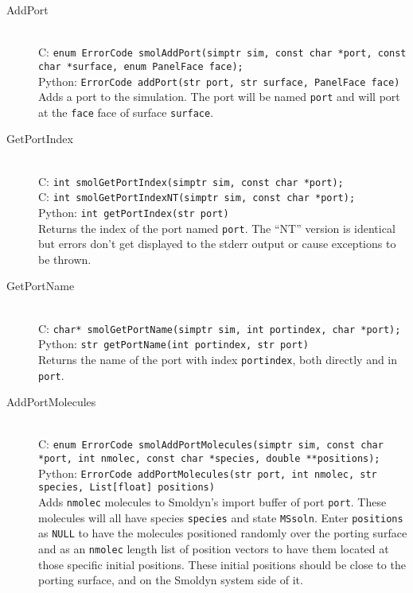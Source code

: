 \documentclass {book}
\begin{document}
\begin{description}

\item[AddPort]
\hfill \\
C: \texttt{enum ErrorCode smolAddPort(simptr sim, const char *port, const char *surface, enum PanelFace face);}\\
Python: \texttt{ErrorCode addPort(str port, str surface, PanelFace face)}\\
Adds a port to the simulation. The port will be named \texttt{port} and will port at the \texttt{face} face of surface \texttt{surface}.

\item[GetPortIndex]
\hfill \\
C: \texttt{int smolGetPortIndex(simptr sim, const char *port);}\\
C: \texttt{int smolGetPortIndexNT(simptr sim, const char *port);}\\
Python: \texttt{int getPortIndex(str port)}\\
Returns the index of the port named \texttt{port}. The ``NT'' version is identical but errors don't get displayed to the stderr output or cause exceptions to be thrown.

\item[GetPortName]
\hfill \\
C: \texttt{char* smolGetPortName(simptr sim, int portindex, char *port);}\\
Python: \texttt{str getPortName(int portindex, str port)}\\
Returns the name of the port with index \texttt{portindex}, both directly and in \texttt{port}.

\item[AddPortMolecules]
\hfill \\
C: \texttt{enum ErrorCode smolAddPortMolecules(simptr sim, const char *port, int nmolec, const char *species, double **positions);}\\
Python: \texttt{ErrorCode addPortMolecules(str port, int nmolec, str species, List[float] positions)}\\
Adds \texttt{nmolec} molecules to Smoldyn's import buffer of port \texttt{port}. These molecules will all have species \texttt{species} and state \texttt{MSsoln}. Enter \texttt{positions} as \texttt{NULL} to have the molecules positioned randomly over the porting surface and as an \texttt{nmolec} length list of position vectors to have them located at those specific initial positions. These initial positions should be close to the porting surface, and on the Smoldyn system side of it.


\end{description}
\end{document}
